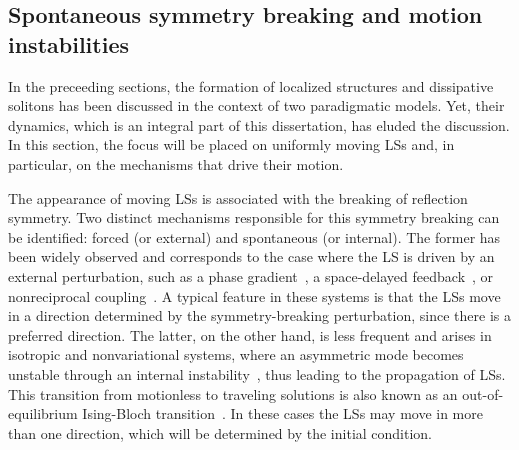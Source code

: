 




\subsection{Spontaneous symmetry breaking and motion instabilities}

In the preceeding sections, the formation of localized structures and dissipative solitons
has been discussed in the context of two paradigmatic models. Yet, their dynamics, which is
an integral part of this dissertation, has eluded the discussion. In this section, the focus
will be placed on uniformly moving LSs and, in particular, on the mechanisms that drive their motion.

The appearance of moving LSs is associated with the breaking of reflection symmetry. Two
distinct mechanisms responsible for this symmetry breaking can be identified: forced
(or external) and spontaneous (or internal). The former has been widely observed and 
corresponds to the case
where the LS is driven by an external perturbation, such as a phase gradient~\cite{turaev2008chaotic}, 
a space-delayed feedback~\cite{haudin2011vortex}, or nonreciprocal coupling~\cite{pinto2021nonreciprocal}. A typical feature in these systems is that the LSs
move in a direction determined by the symmetry-breaking perturbation, since there
is a preferred direction.
The latter, on the other hand, is less frequent and arises in isotropic and
nonvariational systems, where an asymmetric mode becomes unstable through an internal
instability~\cite{michaelis2001universal}, thus leading to the propagation of LSs. This transition from motionless
to traveling solutions is also known as an out-of-equilibrium Ising-Bloch 
transition~\cite{coullet1990breaking,gilli1994ising,haim1996breathing,michaelis2001universal,clerc2010localized}.
In these cases the LSs may move 
in more than one direction, which will be determined by the initial condition. 


